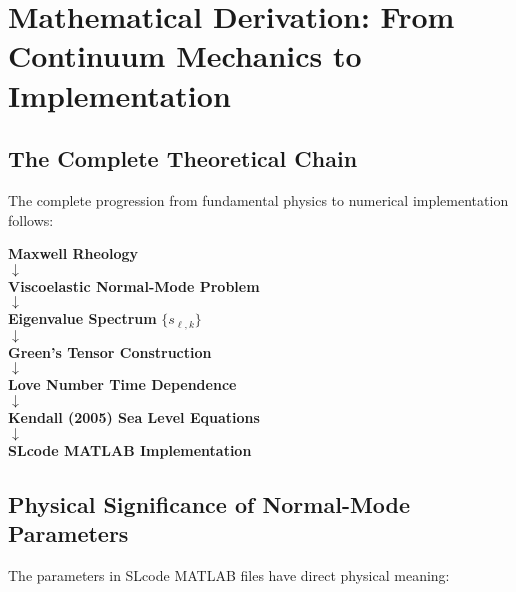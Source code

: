 \documentclass{article}
\begin{document}
\section{Mathematical Derivation: From Continuum Mechanics to Implementation}

\subsection{The Complete Theoretical Chain}

The complete progression from fundamental physics to numerical implementation follows:

\begin{center}
\textbf{Maxwell Rheology} \\
$\downarrow$ \\
\textbf{Viscoelastic Normal-Mode Problem} \\
$\downarrow$ \\
\textbf{Eigenvalue Spectrum} $\{s_{\ell,k}\}$ \\
$\downarrow$ \\
\textbf{Green's Tensor Construction} \\
$\downarrow$ \\
\textbf{Love Number Time Dependence} \\
$\downarrow$ \\
\textbf{Kendall (2005) Sea Level Equations} \\
$\downarrow$ \\
\textbf{SLcode MATLAB Implementation}
\end{center}

\subsection{Physical Significance of Normal-Mode Parameters}

The parameters in SLcode MATLAB files have direct physical meaning:
\end{document}
